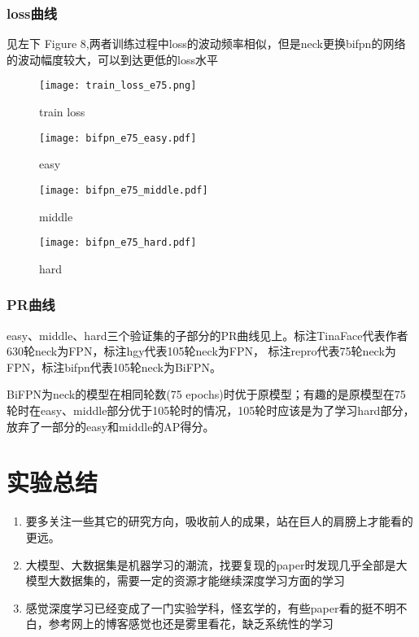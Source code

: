 \documentclass[10pt,a4paper]{article}%
\begin{document}
	\subsubsection{loss曲线}
	见左下 Figure 8,两者训练过程中loss的波动频率相似，但是neck更换bifpn的网络的波动幅度较大，可以到达更低的loss水平
	\begin{figure}[H]%
		\centering
		\begin{minipage}{0.48\textwidth}
			\centering
			\texttt{[image: train\_loss\_e75.png]}
			\caption{\fontsize{10pt}{15pt}\selectfont train loss}
		\end{minipage}
		\hspace{0cm}%
		\hfill%
		\begin{minipage}{0.48\textwidth}
			\centering
			\texttt{[image: bifpn\_e75\_easy.pdf]}
			\caption{\fontsize{10pt}{15pt}\selectfont easy}
		\end{minipage}
	\end{figure}
	\begin{figure}[H]%
		\centering
		\begin{minipage}{0.48\textwidth}
			\centering
			\texttt{[image: bifpn\_e75\_middle.pdf]}
			\caption{\fontsize{10pt}{15pt}\selectfont middle}
		\end{minipage}
		\hspace{0cm}%
		\hfill%
		\begin{minipage}{0.48\textwidth}
			\centering
			\texttt{[image: bifpn\_e75\_hard.pdf]}
			\caption{\fontsize{10pt}{15pt}\selectfont hard}
		\end{minipage}
	\end{figure}	
	\subsubsection{PR曲线}
	easy、middle、hard三个验证集的子部分的PR曲线见上。标注TinaFace代表作者630轮neck为FPN，标注hgy代表105轮neck为FPN，
	标注repro代表75轮neck为FPN，标注bifpn代表105轮neck为BiFPN。

	BiFPN为neck的模型在相同轮数(75 epochs)时优于原模型；有趣的是原模型在75轮时在easy、middle部分优于105轮时的情况，105轮时应该是为了学习hard部分，
	放弃了一部分的easy和middle的AP得分。
	\section{实验总结}
	\begin{enumerate}[1.]
		\item 要多关注一些其它的研究方向，吸收前人的成果，站在巨人的肩膀上才能看的更远。
		\item 大模型、大数据集是机器学习的潮流，找要复现的paper时发现几乎全部是大模型大数据集的，需要一定的资源才能继续深度学习方面的学习
		\item 感觉深度学习已经变成了一门实验学科，怪玄学的，有些paper看的挺不明不白，参考网上的博客感觉也还是雾里看花，缺乏系统性的学习
	\end{enumerate}
\end{document}
